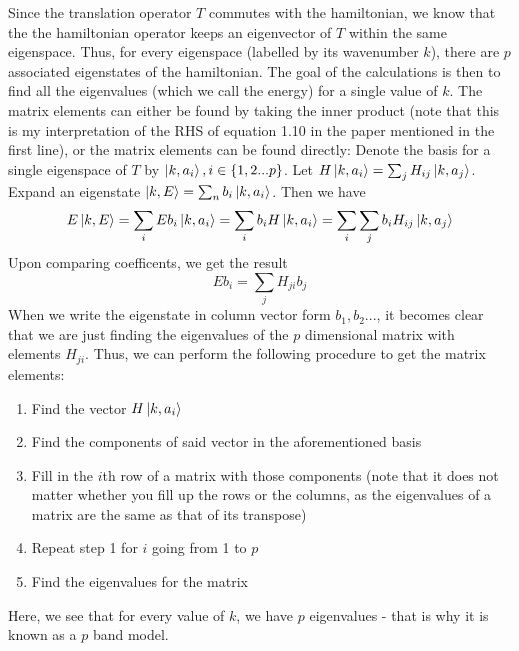 \documentclass[10pt]{article}
\begin{document}
Since the translation operator $T$ commutes with the hamiltonian, we know that the the hamiltonian operator keeps an eigenvector of $T$ within the same eigenspace. Thus, for every eigenspace (labelled by its wavenumber $k$), there are $p$ associated eigenstates of the hamiltonian. The goal of the calculations is then to find all the eigenvalues (which we call the energy) for a single value of $k$. The matrix elements can either be found by taking the inner product (note that this is my interpretation of the RHS of equation 1.10 in the paper mentioned in the first line), or the matrix elements can be found directly: Denote the basis for a single eigenspace of $T$ by $\ket{k,a_i}, i\in\{1, 2...p\}$. Let $H\ket{k,a_i}=\sum_j H_{ij}\ket{k,a_j}$. Expand an eigenstate $\ket{k,E}=\sum_n b_i\ket{k,a_i}$. Then we have
$$E\ket{k,E}=\sum_i Eb_i\ket{k,a_i}=\sum_i b_i H\ket{k,a_i}=\sum_i\sum_j b_i H_{ij}\ket{k,a_j}$$
Upon comparing coefficents, we get the result
$$Eb_i=\sum_j H_{ji}b_j$$
When we write the eigenstate in column vector form $b_1, b_2...$, it becomes clear that we are just finding the eigenvalues of the $p$ dimensional matrix with elements $H_{ji}$. Thus, we can perform the following procedure to get the matrix elements:

\begin{enumerate}
\item Find the vector $H\ket{k,a_i}$
\item Find the components of said vector in the aforementioned basis
\item Fill in the $i$th row of a matrix with those components (note that it does not matter whether you fill up the rows or the columns, as the eigenvalues of a matrix are the same as that of its transpose)
\item Repeat step 1 for $i$ going from 1 to $p$
\item Find the eigenvalues for the matrix
\end{enumerate}

Here, we see that for every value of $k$, we have $p$ eigenvalues - that is why it is known as a $p$ band model.
\end{document}
